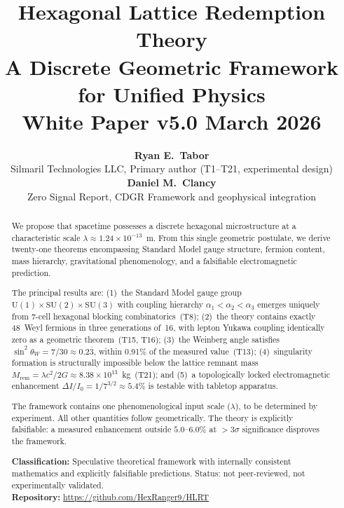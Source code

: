 \documentclass[11pt,letterpaper]{article}
\title{
\vspace{-1.5cm}
{\Huge\textbf{\color{hlrtblue}Hexagonal Lattice Redemption Theory}}\\[0.6em]
{\LARGE A Discrete Geometric Framework for Unified Physics}\\[0.8em]
{\large White Paper v5.0 \quad\textbullet\quad March 2026}
}
\author{
\textbf{Ryan E.\ Tabor}\\
{\small Silmaril Technologies LLC, Primary author (T1--T21, experimental design)}\\[0.5em]
\textbf{Daniel M.\ Clancy}\\
{\small Zero Signal Report, CDGR Framework and geophysical integration}
}
\date{}
\begin{document}

\maketitle

\begin{abstract}
\noindent
We propose that spacetime possesses a discrete hexagonal microstructure
at a characteristic scale $\lambda \approx 1.24 \times 10^{-13}$~m.
From this single geometric postulate, we derive twenty-one theorems
encompassing Standard Model gauge structure, fermion content, mass
hierarchy, gravitational phenomenology, and a falsifiable
electromagnetic prediction.

The principal results are: (1)~the Standard Model gauge group
$\mathrm{U}(1)\times\mathrm{SU}(2)\times\mathrm{SU}(3)$ with coupling
hierarchy $\alpha_1 < \alpha_2 < \alpha_3$ emerges uniquely from
7-cell hexagonal blocking combinatorics~(T8); (2)~the theory contains
exactly 48~Weyl fermions in three generations of~16, with lepton
Yukawa coupling identically zero as a geometric theorem~(T15, T16);
(3)~the Weinberg angle satisfies $\sin^2\!\theta_W = 7/30 \approx
0.2\overline{3}$, within 0.91\% of the measured value~(T13);
(4)~singularity formation is structurally impossible below the lattice
remnant mass $M_\mathrm{rem} = \lambda c^2/2G \approx 8.38 \times
10^{13}$~kg~(T21); and (5)~a topologically locked electromagnetic
enhancement $\Delta I/I_0 = 1/7^{3/2} \approx 5.4\%$ is testable with
tabletop apparatus.

The framework contains one phenomenological input scale ($\lambda$),
to be determined by experiment.  All other quantities follow
geometrically.  The theory is explicitly falsifiable: a measured
enhancement outside $5.0$--$6.0\%$ at $>3\sigma$ significance
disproves the framework.

\medskip\noindent
\textbf{Classification:} Speculative theoretical framework with
internally consistent mathematics and explicitly falsifiable
predictions.  Status: not peer-reviewed, not experimentally
validated.\\[2pt]
\textbf{Repository:} \url{https://github.com/HexRanger9/HLRT}
\end{abstract}
\end{document}
